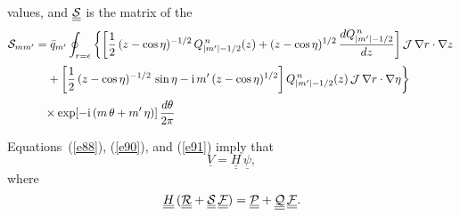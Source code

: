 \documentclass[12pt,prb,aps,notitlepage]{revtex4-1}
\begin{document}
values, and 
$\underline{\underline{{\cal S}}}$ is the matrix of the 
\begin{align}
{\cal S}_{mm'} &=\bar{q}_{m'}\oint_{r=\epsilon}
\left\{\left[\frac{1}{2}\,(z-\cos\eta)^{-1/2}\,Q_{|m'|-1/2}^{\,n}(z)+(z-\cos\eta)^{1/2}\,\frac{dQ_{|m'|-1/2}^{\,n}}{dz}\right]{\cal J}\,\nabla r\cdot \nabla z
\right.\nonumber\\[0.5ex]&
\left.\phantom{=}+\left[\frac{1}{2}\,(z-\cos\eta)^{-1/2}\,\sin\eta-{\rm i}\,m'\,(z-\cos\eta)^{1/2}\right]Q_{|m'|-1/2}^{\,n}(z)\,{\cal J}\,\nabla r\cdot \nabla \eta
\right\}\nonumber\\[0.5ex] &
\phantom{=}\times\exp[-{\rm i}\,(m\,\theta+m'\,\eta)]\,\frac{d\theta}{2\pi}
\end{align}

Equations~(\ref{e88}), (\ref{e90}), and (\ref{e91}) imply that
\begin{equation}
\underline{V}= \underline{\underline{H}}\,\underline{\psi},
\end{equation}
where
\begin{equation}
\underline{\underline{H}}\,(\underline{\underline{\cal R}}+\underline{\underline{\cal S}}\,\underline{\underline{\cal F}}) = \underline{\underline{\cal P}}+\underline{\underline{\cal Q}}\,\underline{\underline{\cal F}}.
\end{equation}
\end{document}
